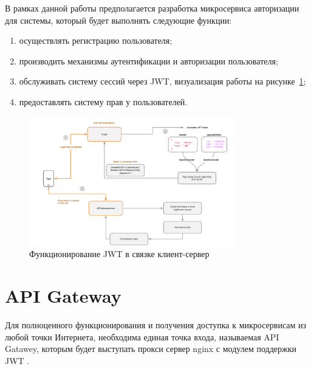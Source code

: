 В рамках данной работы предполагается разработка микросервиса авторизации для системы, который будет выполнять следующие функции:

\begin{enumerate}
    \item осуществлять регистрацию пользователя;
    \item производить механизмы аутентификации и авторизации пользователя;
    \item обслуживать систему сессий через JWT, визуализация работы на рисунке~\ref{fig:jwt};
    \item предоставлять систему прав у пользователей.
\end{enumerate}

\begin{figure}
  \centering
  \includegraphics[width=0.8\textwidth]{graphics/img/jwt.png}
  \caption{Функционирование JWT в связке клиент-сервер}
  \label{fig:jwt}
\end{figure}


\section{API Gateway}
Для полноценного функционирования и получения доступка к микросервисам из любой точки Интернета, необходима единая точка входа, называемая API Gatawey, которым будет выступать прокси сервер nginx с модулем поддержки 
JWT \cite{arch:api}. 

\newpage

